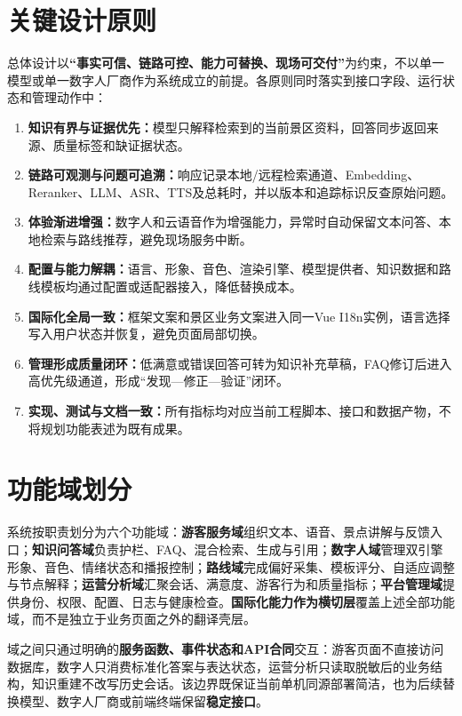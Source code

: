 \section{关键设计原则}

总体设计以\textbf{“事实可信、链路可控、能力可替换、现场可交付”}为约束，不以单一模型或单一数字人厂商作为系统成立的前提。各原则同时落实到接口字段、运行状态和管理动作中：

\begin{enumerate}
  \item \textbf{知识有界与证据优先：}模型只解释检索到的当前景区资料，回答同步返回来源、质量标签和缺证据状态。
  \item \textbf{链路可观测与问题可追溯：}响应记录本地/远程检索通道、Embedding、Reranker、LLM、ASR、TTS及总耗时，并以版本和追踪标识反查原始问题。
  \item \textbf{体验渐进增强：}数字人和云语音作为增强能力，异常时自动保留文本问答、本地检索与路线推荐，避免现场服务中断。
  \item \textbf{配置与能力解耦：}语言、形象、音色、渲染引擎、模型提供者、知识数据和路线模板均通过配置或适配器接入，降低替换成本。
  \item \textbf{国际化全局一致：}框架文案和景区业务文案进入同一Vue I18n实例，语言选择写入用户状态并恢复，避免页面局部切换。
  \item \textbf{管理形成质量闭环：}低满意或错误回答可转为知识补充草稿，FAQ修订后进入高优先级通道，形成“发现—修正—验证”闭环。
  \item \textbf{实现、测试与文档一致：}所有指标均对应当前工程脚本、接口和数据产物，不将规划功能表述为既有成果。
\end{enumerate}

\section{功能域划分}

系统按职责划分为六个功能域：\textbf{游客服务域}组织文本、语音、景点讲解与反馈入口；\textbf{知识问答域}负责护栏、FAQ、混合检索、生成与引用；\textbf{数字人域}管理双引擎形象、音色、情绪状态和播报控制；\textbf{路线域}完成偏好采集、模板评分、自适应调整与节点解释；\textbf{运营分析域}汇聚会话、满意度、游客行为和质量指标；\textbf{平台管理域}提供身份、权限、配置、日志与健康检查。\textbf{国际化能力作为横切层}覆盖上述全部功能域，而不是独立于业务页面之外的翻译壳层。

域之间只通过明确的\textbf{服务函数、事件状态和API合同}交互：游客页面不直接访问数据库，数字人只消费标准化答案与表达状态，运营分析只读取脱敏后的业务结构，知识重建不改写历史会话。该边界既保证当前单机同源部署简洁，也为后续替换模型、数字人厂商或前端终端保留\textbf{稳定接口}。
